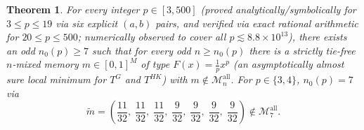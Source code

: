 \documentclass[11pt]{article}
\newtheorem{theorem}{Theorem}
\theoremstyle{definition}
\theoremstyle{remark}
\begin{document}
\begin{theorem}\label{thm:dense}
For every integer $p \in [3, 500]$ (proved analytically/symbolically for $3 \le p \le 19$ via six explicit $(a, b)$ pairs, and verified via exact rational arithmetic for $20 \le p \le 500$; numerically observed to cover all $p \lesssim 8.8 \times 10^{13}$), there exists an odd $n_0(p) \ge 7$ such that for every odd $n \ge n_0(p)$ there is a strictly tie-free $n$-mixed memory $m \in [0,1]^M$ of type $F(x) = \frac{1}{p}x^p$ (an asymptotically almost sure local minimum for $T^G$ and $T^{HK}$) with $m \notin \mathcal{M}_n^{\mathrm{all}}$. For $p \in \{3, 4\}$, $n_0(p) = 7$ via
\[
  \tilde{m} = \left(\frac{11}{32},\;\frac{11}{32},\;\frac{11}{32},\;\frac{9}{32},\;\frac{9}{32},\;\frac{9}{32},\;\frac{9}{32}\right) \notin \mathcal{M}_7^{\mathrm{all}}.
\]
\end{theorem}
\end{document}
